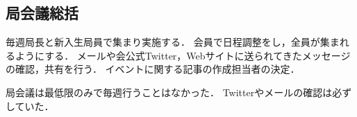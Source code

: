 \subsection*{局会議総括}



毎週局長と新入生局員で集まり実施する．
会員で日程調整をし，全員が集まれるようにする．
メールや会公式Twitter，Webサイトに送られてきたメッセージの確認，共有を行う．
イベントに関する記事の作成担当者の決定．

局会議は最低限のみで毎週行うことはなかった．
Twitterやメールの確認は必ずしていた．
